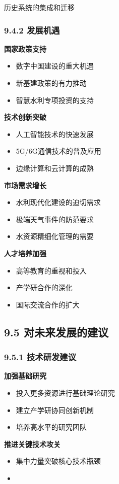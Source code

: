 \begin{itemize}
历史系统的集成和迁移 \end{itemize} \subsubsection{9.4.2 发展机遇}\label{ux53d1ux5c55ux673aux9047-1} \textbf{国家政策支持} \begin{itemize}
\tightlist \item 数字中国建设的重大机遇 \item 新基建政策的有力推动 \item 智慧水利专项投资的支持 \end{itemize} \textbf{技术创新突破} \begin{itemize} \tightlist
\item 人工智能技术的快速发展 \item 5G/6G通信技术的普及应用 \item 边缘计算和云计算的成熟 \end{itemize} \textbf{市场需求增长} \begin{itemize} \tightlist \item
水利现代化建设的迫切需求 \item 极端天气事件的防范要求 \item 水资源精细化管理的需要 \end{itemize} \textbf{人才培养加强} \begin{itemize} \tightlist \item
高等教育的重视和投入 \item 产学研合作的深化 \item 国际交流合作的扩大 \end{itemize} \subsection{9.5
对未来发展的建议}\label{ux5bf9ux672aux6765ux53d1ux5c55ux7684ux5efaux8bae} \subsubsection{9.5.1
技术研发建议}\label{ux6280ux672fux7814ux53d1ux5efaux8bae} \textbf{加强基础研究} \begin{itemize} \tightlist \item 投入更多资源进行基础理论研究
\item 建立产学研协同创新机制 \item 培养高水平的研究团队 \end{itemize} \textbf{推进关键技术攻关} \begin{itemize} \tightlist \item 集中力量突破核心技术瓶颈 \item

\end{itemize}
